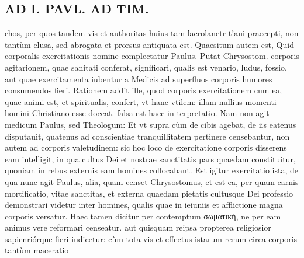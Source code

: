 \documentclass{article}
\begin{document}
\begin{pages}
\section*{AD I. PAVL. AD TIM. }
\marginpar{[ p.208 ]}\pstart chos, per quos tandem vis et authoritas huius tam lacrolanetr t'aui praecepti, non tantùm elusa, sed abrogata et prorsus antiquata est.  \pend\pstart Quaesitum autem est, Quid corporalis exercitationis nomine complectatur Paulus. Putat Chrysostom. corporis agitarionem, quae sanitati conferat, significari, qualis est venario, ludus, fossio, aut quae exercitamenta iubentur a Medicis ad superfluos corporis humores consumendos fieri. Rationem addit ille, quod corporis exercitationem cum ea, quae animi est, et spiritualis, confert, vt hanc vtilem: illam nullius momenti homini Christiano esse doceat. falsa est haec in terpretatio. Nam non agit medicum Paulus, sed Theologum: Et vt supra cùm de cibis agebat, de iis eatenus disputauit, quatenus ad conscientiae tranquillitatem pertinere censebantur, non autem ad corporis valetudinem: sic hoc loco de exercitatione corporis disserens eam intelligit, in qua cultus Dei et nostrae sanctitatis pars quaedam constituitur, quoniam in rebus externis eam homines collocabant.  \pend\pstart Est igitur exercitatio ista, de qua nunc agit Paulus, alia, quam censet Chrysostomus, et est ea, per quam carnis mortificatio, vitae sanctitas, et externa quaedam pietatis cultusque Dei professio demonstrari videtur inter homines, qualis quae in ieiuniis et afflictione magna corporis versatur. Haec tamen dicitur per contemptum σωματικὴ, ne per eam animus vere reformari censeatur. aut quisquam reipsa propterea religiosior sapienriórque fieri iudicetur: cùm tota vis et effectus istarum rerum circa corporis tantùm maceratio\pend

\end{pages}
\end{document}
